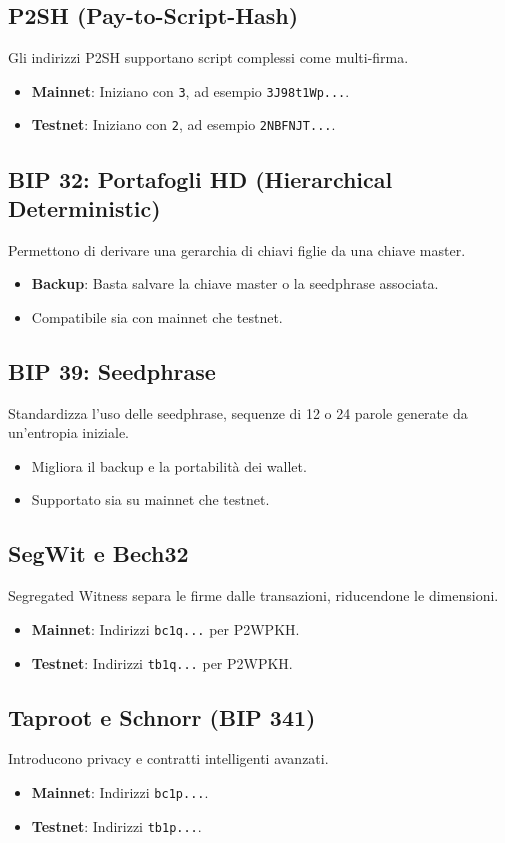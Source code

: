 \documentclass{article}
\begin{document}
\subsection{P2SH (Pay-to-Script-Hash)}
Gli indirizzi P2SH supportano script complessi come multi-firma.
\begin{itemize}
    \item \textbf{Mainnet}: Iniziano con \texttt{3}, ad esempio \texttt{3J98t1Wp...}.
    \item \textbf{Testnet}: Iniziano con \texttt{2}, ad esempio \texttt{2NBFNJT...}.
\end{itemize}

\subsection{BIP 32: Portafogli HD (Hierarchical Deterministic)}
Permettono di derivare una gerarchia di chiavi figlie da una chiave master.
\begin{itemize}
    \item \textbf{Backup}: Basta salvare la chiave master o la seedphrase associata.
    \item Compatibile sia con mainnet che testnet.
\end{itemize}

\subsection{BIP 39: Seedphrase}
Standardizza l'uso delle seedphrase, sequenze di 12 o 24 parole generate da un'entropia iniziale.
\begin{itemize}
    \item Migliora il backup e la portabilit\`a dei wallet.
    \item Supportato sia su mainnet che testnet.
\end{itemize}

\subsection{SegWit e Bech32}
Segregated Witness separa le firme dalle transazioni, riducendone le dimensioni.
\begin{itemize}
    \item \textbf{Mainnet}: Indirizzi \texttt{bc1q...} per P2WPKH.
    \item \textbf{Testnet}: Indirizzi \texttt{tb1q...} per P2WPKH.
\end{itemize}

\subsection{Taproot e Schnorr (BIP 341)}
Introducono privacy e contratti intelligenti avanzati.
\begin{itemize}
    \item \textbf{Mainnet}: Indirizzi \texttt{bc1p...}.
    \item \textbf{Testnet}: Indirizzi \texttt{tb1p...}.
\end{itemize}
\end{document}
